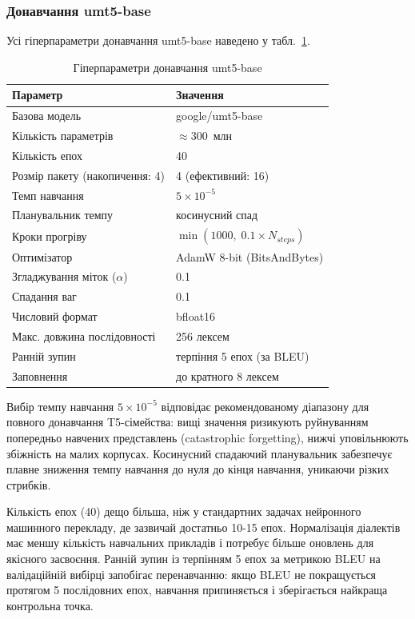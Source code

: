 \documentclass[14pt]{extarticle}
\begin{document}
\subsubsection{Донавчання umt5-base}

Усі гіперпараметри донавчання umt5-base наведено у табл.~\ref{tab:umt5_hparams}.

\captionsetup[table]{justification=raggedleft}
\begin{table}[h]
\caption{Гіперпараметри донавчання umt5-base}
\label{tab:umt5_hparams}
\setlength{\tabcolsep}{4pt}
\begin{tabular}{|p{}|p{}|}
\hline
\textbf{Параметр} & \textbf{Значення} \\
\hline
Базова модель & google/umt5-base \\
\hline
Кількість параметрів & $\approx$300~млн \\
\hline
Кількість епох & 40 \\
\hline
Розмір пакету (накопичення: 4) & 4 (ефективний: 16) \\
\hline
Темп навчання & $5 \times 10^{-5}$ \\
\hline
Планувальник темпу & косинусний спад \\
\hline
Кроки прогріву & $\min(1000,\; 0.1 \times N_{steps})$ \\
\hline
Оптимізатор & AdamW 8-bit (BitsAndBytes) \\
\hline
Згладжування міток ($\alpha$) & 0.1 \\
\hline
Спадання ваг & 0.1 \\
\hline
Числовий формат & bfloat16 \\
\hline
Макс. довжина послідовності & 256 лексем \\
\hline
Ранній зупин & терпіння 5 епох (за BLEU) \\
\hline
Заповнення & до кратного 8 лексем \\
\hline
\end{tabular}
\end{table}

Вибір темпу навчання $5 \times 10^{-5}$ відповідає рекомендованому діапазону для повного донавчання T5-сімейства: вищі значення ризикують руйнуванням попередньо навчених представлень (catastrophic forgetting), нижчі уповільнюють збіжність на малих корпусах. Косинусний спадаючий планувальник забезпечує плавне зниження темпу навчання до нуля до кінця навчання, уникаючи різких стрибків.

Кількість епох (40) дещо більша, ніж у стандартних задачах нейронного машинного перекладу, де зазвичай достатньо 10-15 епох. Нормалізація діалектів має меншу кількість навчальних прикладів і потребує більше оновлень для якісного засвоєння. Ранній зупин із терпінням 5 епох за метрикою BLEU на валідаційній вибірці запобігає перенавчанню: якщо BLEU не покращується протягом 5 послідовних епох, навчання припиняється і зберігається найкраща контрольна точка.
\end{document}
